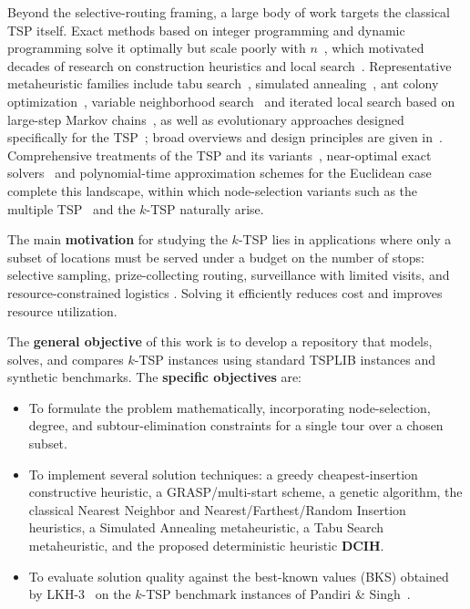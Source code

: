 \documentclass[conference]{IEEEtran}
\begin{document}
\vspace{2pt}
Beyond the selective-routing framing, a large body of work targets the classical TSP itself. Exact methods based on integer programming and dynamic programming solve it optimally but scale poorly with $n$~\cite{dantzig1954,bellman1962,heldkarp1962,karp1972}, which motivated decades of research on construction heuristics and local search~\cite{lin1965,christofides1976,bentley1992,johnson1997,laporte1992}. Representative metaheuristic families include tabu search~\cite{glover1986,gloverlaguna1997,knox1994}, simulated annealing~\cite{cerny1985}, ant colony optimization~\cite{dorigo1997acs}, variable neighborhood search~\cite{mladenovic1997vns} and iterated local search based on large-step Markov chains~\cite{martin1991}, as well as evolutionary approaches designed specifically for the TSP~\cite{potvin1996}; broad overviews and design principles are given in~\cite{blumroli2003,talbi2009}. Comprehensive treatments of the TSP and its variants~\cite{gutin2007book}, near-optimal exact solvers~\cite{applegate2006concorde} and polynomial-time approximation schemes for the Euclidean case~\cite{arora1998} complete this landscape, within which node-selection variants such as the multiple TSP~\cite{bektas2006} and the $k$-TSP naturally arise.

\vspace{2pt}
The main \textbf{motivation} for studying the $k$-TSP lies in applications where only a subset of locations must be served under a budget on the number of stops: selective sampling, prize-collecting routing, surveillance with limited visits, and resource-constrained logistics \cite{vansteenwegen2011top,blanchard2023}. Solving it efficiently reduces cost and improves resource utilization.

\vspace{2pt}
The \textbf{general objective} of this work is to develop a repository that models, solves, and compares $k$-TSP instances using standard TSPLIB instances and synthetic benchmarks. The \textbf{specific objectives} are:
\begin{itemize}
    \item To formulate the problem mathematically, incorporating node-selection, degree, and subtour-elimination constraints for a single tour over a chosen subset.
    \item To implement several solution techniques: a greedy cheapest-insertion constructive heuristic, a GRASP/multi-start scheme, a genetic algorithm, the classical Nearest Neighbor and Nearest/Farthest/Random Insertion heuristics, a Simulated Annealing metaheuristic, a Tabu Search metaheuristic, and the proposed deterministic heuristic \textbf{DCIH}.
    \item To evaluate solution quality against the best-known values (BKS) obtained by LKH-3~\cite{Helsgaun,lin1973} on the $k$-TSP benchmark instances of Pandiri \& Singh~\cite{pandiri2020}.
\end{itemize}
\end{document}
